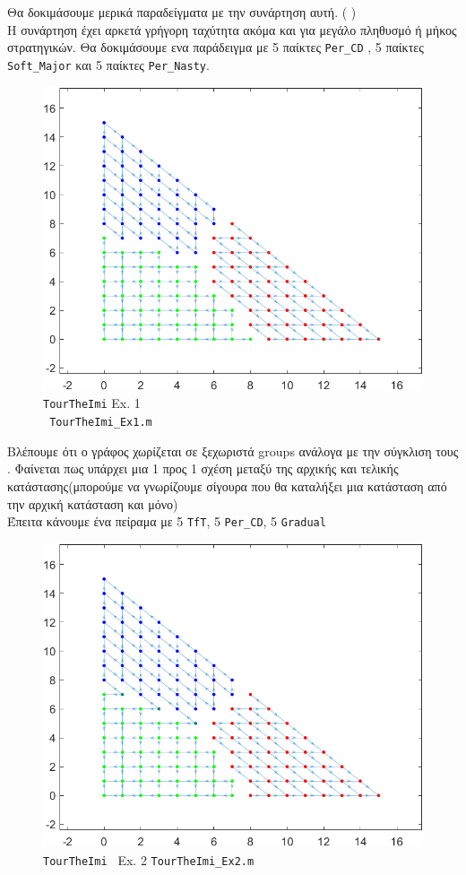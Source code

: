 Θα δοκιμάσουμε μερικά παραδείγματα με την συνάρτηση αυτή. (  )
\\ 



Η συνάρτηση έχει αρκετά γρήγορη ταχύτητα ακόμα και για μεγάλο πληθυσμό ή μήκος στρατηγικών. Θα δοκιμάσουμε ενα παράδειγμα με 5 παίκτες \texttt{Per\_CD} , 5 παίκτες \texttt{Soft\_Major} και 5 παίκτες \texttt{Per\_Nasty}.
\begin{figure}[th!]
	\centering
	\includegraphics[width=0.7\linewidth]{TourTheImi_Ex1}
	\caption{\texttt{TourTheImi} Ex. 1\\ \texttt{ TourTheImi\_Ex1.m}}
	\label{fig:tourtheimiex1}
\end{figure}


Βλέπουμε ότι ο γράφος χωρίζεται σε ξεχωριστά groups ανάλογα με την σύγκλιση τους . Φαίνεται πως υπάρχει μια 1 προς 1 σχέση μεταξύ της αρχικής και τελικής κατάστασης(μπορούμε να γνωρίζουμε σίγουρα που θα καταλήξει μια κατάσταση από την αρχική κατάσταση και μόνο)
\\
Έπειτα κάνουμε ένα πείραμα με 5 \texttt{TfT}, 5 \texttt{Per\_CD}, 5 \texttt{Gradual}
\begin{figure}[th!]
	\centering
	\includegraphics[width=0.7\linewidth]{TourTheImi_Ex2}
	\caption{\texttt{TourTheImi } Ex. 2    \texttt{TourTheImi\_Ex2.m}}
	\label{fig:tourtheimiex2}
\end{figure}

